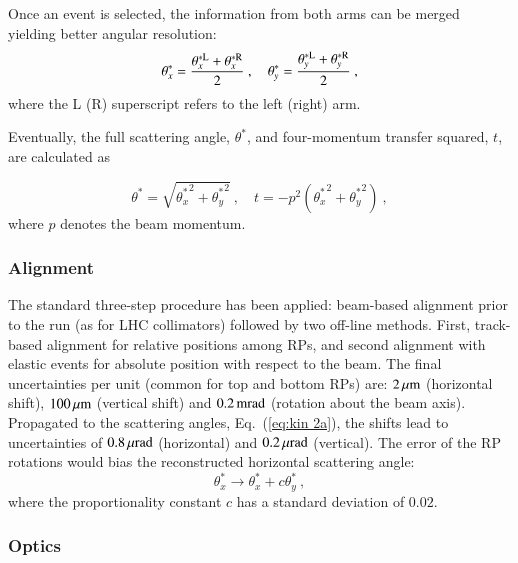 Once an event is selected, the information from both arms can be merged yielding better angular resolution:
\begin{equation}
\label{eq:kin 2a}
\theta_x^* = {\theta_x^{*\rm L} + \theta_x^{*\rm R} \over 2}\ ,\quad \theta_y^* = {\theta_y^{*\rm L} + \theta_y^{*\rm R} \over 2}\ ,
\end{equation}
where the L (R) superscript refers to the left (right) arm.

Eventually, the full scattering angle, $\theta^*$, and four-momentum transfer squared, $t$, are calculated as

\begin{equation}
\label{eq:th t}
\theta^* = \sqrt{{\theta_x^*}^2 + {\theta_y^*}^2}\ ,\quad t = - p^2 ({\theta_x^*}^2 + {\theta_y^*}^2)\ ,
\end{equation}
where $p$ denotes the beam momentum.


\subsubsection{Alignment}
\label{sec:alignment}

The standard three-step procedure \cite{totem-ijmp} has been applied: beam-based alignment prior to the run (as for LHC collimators) followed by two off-line methods. First, track-based alignment for relative positions among RPs, and second alignment with elastic events for absolute position with respect to the beam. The final uncertainties per unit (common for top and bottom RPs) are: $2\,{\rm \mu m}$ (horizontal shift), $100\,{\rm \mu m}$ (vertical shift) and $0.2\,{\rm mrad}$ (rotation about the beam axis). Propagated to the scattering angles, Eq.~(\ref{eq:kin 2a}), the shifts lead to uncertainties of $0.8\,{\rm \mu rad}$ (horizontal) and $0.2\,{\rm \mu rad}$ (vertical). The error of the RP rotations would bias the reconstructed horizontal scattering angle:
\begin{equation}
\label{eq:alig rot bias}
\theta_x^* \rightarrow \theta_x^* + c \theta_y^*\ ,
\end{equation}
where the proportionality constant $c$ has a standard deviation of $0.02$.




\subsubsection{Optics}
\label{sec:optics}

